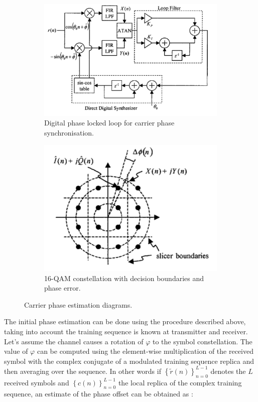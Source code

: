 \documentclass[12pt,a4paper,openright]{report}
\begin{document}
 \begin{figure}[H]
 \centering
\begin{subfigure}{0.5\textwidth}
 \centering
    \includegraphics[width=0.9\linewidth]{DPLL.pdf}
    \caption{Digital phase locked loop for carrier phase \\ synchronisation. \\}
    \label{fig:DPLL}
\end{subfigure}%
\begin{subfigure}{0.5\textwidth}
 \centering
    \includegraphics[width=0.7\linewidth]{PD.pdf}
    \caption{16-QAM constellation with decision boundaries and phase error.}
    \label{fig:PD1}
    \end{subfigure}
    \caption[Carrier phase estimation diagrams]{Carrier phase estimation diagrams\label{CarrierSynchPaper}.}
    \label{fig:carrierphase}
\end{figure}

The initial phase estimation can be done using the procedure described above, taking into account the training sequence is known at transmitter and receiver. Let's assume the channel causes a rotation of $\varphi$ to the symbol constellation. The value of $\varphi$ can be computed using the element-wise multiplication of the received symbol with the complex conjugate of a modulated training sequence replica and then averaging over the sequence. In other words if ${\left\{ {\tilde r(n)} \right\}_{n = 0}^{L - 1}}$ denotes the $L$ received symbols and ${\left\{ {c(n)} \right\}_{n = 0}^{L - 1}}$ the local replica of the complex training sequence, an estimate of the phase offset can be obtained as \cite{ProjectEQ2310}:
\end{document}
